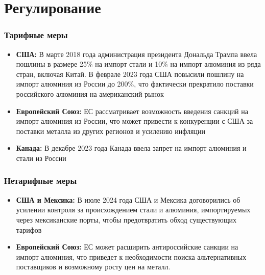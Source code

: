 \section{Регулирование}

\begin{frame}
    \frametitle{Тарифные меры}
    \begin{itemize}
        \item \textbf{США:} В марте 2018 года администрация президента Дональда Трампа ввела пошлины в размере 25\% на импорт стали и 10\% на импорт алюминия из ряда стран, включая Китай. В феврале 2023 года США повысили пошлину на импорт алюминия из России до 200\%, что фактически прекратило поставки российского алюминия на американский рынок
        \item \textbf{Европейский Союз:} ЕС рассматривает возможность введения санкций на импорт алюминия из России, что может привести к конкуренции с США за поставки металла из других регионов и усилению инфляции
        \item \textbf{Канада:} В декабре 2023 года Канада ввела запрет на импорт алюминия и стали из России
    \end{itemize}
\end{frame}

\begin{frame}
    \frametitle{Нетарифные меры}
    \begin{itemize}
        \item \textbf{США и Мексика:} В июле 2024 года США и Мексика договорились об усилении контроля за происхождением стали и алюминия, импортируемых через мексиканские порты, чтобы предотвратить обход существующих тарифов
        \item \textbf{Европейский Союз:} ЕС может расширить антироссийские санкции на импорт алюминия, что приведет к необходимости поиска альтернативных поставщиков и возможному росту цен на металл.
    \end{itemize}
\end{frame}